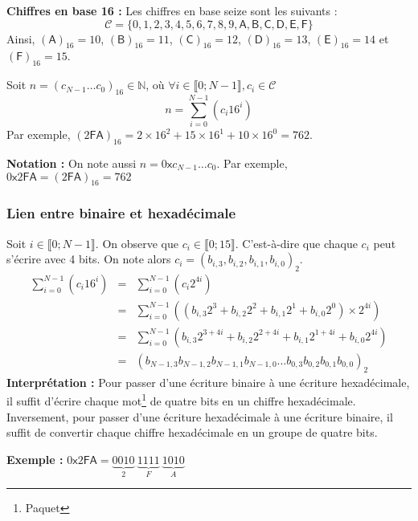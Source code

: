 \documentclass[../../main.tex]{subfiles}
\begin{document}
\textbf{Chiffres en base 16 :} Les chiffres en base seize sont les suivants :
$$\mathcal{C} = \{0, 1, 2, 3, 4, 5, 6, 7, 8, 9, \textsf{A}, \textsf{B}, \textsf{C}, \textsf{D}, \textsf{E}, \textsf{F}\}$$
Ainsi, $(\textsf{A})_{16} = 10$, $(\textsf{B})_{16} = 11$, $(\textsf{C})_{16} = 12$, $(\textsf{D})_{16} = 13$, $(\textsf{E})_{16} = 14$ et $(\textsf{F})_{16} = 15$.

Soit $n = (c_{N-1}\dots c_{0})_{16}\in{\mathbb{N}}$, où $\forall{i\in{\llbracket0; N-1\rrbracket}}, c_{i}\in{\mathcal{C}}$
$$n = \displaystyle\sum_{i = 0}^{N-1}\left(c_{i}16^{i}\right)$$ 
Par exemple, $(2\textsf{FA})_{16} = 2\times{16^{2}} + 15\times{16^{1}} + 10\times{16^{0}} = 762$.

\textbf{Notation :} On note aussi $n = 0\textsf{x}c_{N-1}\dots c_{0}$. Par exemple, $0\textsf{x}2\textsf{FA} = (2\textsf{FA})_{16} = 762$

\subsubsection{Lien entre binaire et hexadécimale} \label{ssub:lien_entre_binaire_et_hexad_cimale}

Soit $i\in{\llbracket 0; N-1\rrbracket}$. On observe que $c_{i}\in{\llbracket 0; 15\rrbracket}$. C'est-à-dire que chaque $c_{i}$ peut s'écrire avec 4 bits. On note alors $c_{i} = (b_{i, 3}, b_{i, 2}, b_{i, 1}, b_{i, 0})_{2}$.
$$
\begin{array}{lcl}
\displaystyle\sum_{i = 0}^{N-1}\left(c_{i}16^{i}\right) & = & \displaystyle\sum_{i = 0}^{N-1}\left(c_{i}2^{4i}\right) \\
 & = & \displaystyle\sum_{i = 0}^{N-1}\left((b_{i, 3}2^{3} + b_{i, 2}2^{2} + b_{i, 1}2^{1} + b_{i, 0}2^{0})\times2^{4i}\right) \\
 & = & \displaystyle\sum_{i = 0}^{N-1}\left(b_{i, 3}2^{3 + 4i} + b_{i, 2}2^{2 + 4i} + b_{i, 1}2^{1 + 4i} + b_{i, 0}2^{4i}\right) \\
 & = & (b_{N-1, 3}b_{N-1, 2}b_{N-1, 1}b_{N-1, 0}\dots b_{0, 3}b_{0, 2}b_{0, 1}b_{0, 0})_{2}
\end{array}
$$
\textbf{Interprétation :} Pour passer d'une écriture binaire à une écriture hexadécimale, il suffit d'écrire chaque mot\footnote{Paquet} de quatre bits en un chiffre hexadécimale. Inversement, pour passer d'une écriture hexadécimale à une écriture binaire, il suffit de convertir chaque chiffre hexadécimale en un groupe de quatre bits.

\textbf{Exemple :}  $0\textsf{x}2\textsf{FA} = \underbrace{0010}_{2}\ \underbrace{1111}_{F}\ \underbrace{1010}_{A}$
\end{document}
